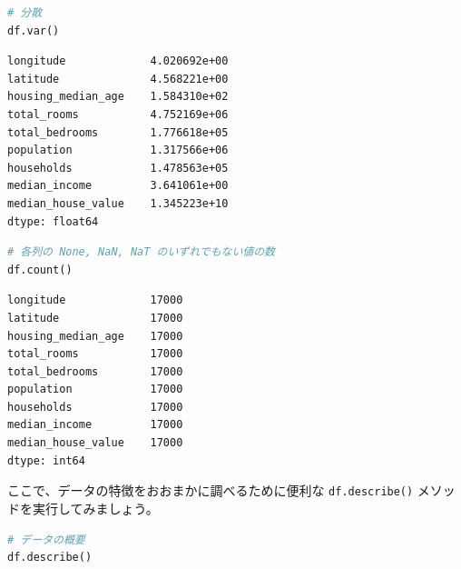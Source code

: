 \begin{lstlisting}[style=codecell,language=Python]
# 分散
df.var()
\end{lstlisting}

\begin{lstlisting}[style=outputcell]
longitude             4.020692e+00
latitude              4.568221e+00
housing_median_age    1.584310e+02
total_rooms           4.752169e+06
total_bedrooms        1.776618e+05
population            1.317566e+06
households            1.478563e+05
median_income         3.641061e+00
median_house_value    1.345223e+10
dtype: float64
\end{lstlisting}

\begin{lstlisting}[style=codecell,language=Python]
# 各列の None, NaN, NaT のいずれでもない値の数
df.count()
\end{lstlisting}

\begin{lstlisting}[style=outputcell]
longitude             17000
latitude              17000
housing_median_age    17000
total_rooms           17000
total_bedrooms        17000
population            17000
households            17000
median_income         17000
median_house_value    17000
dtype: int64
\end{lstlisting}

ここで、データの特徴をおおまかに調べるために便利な \texttt{df.describe()} メソッドを実行してみましょう。


\begin{lstlisting}[style=codecell,language=Python]
# データの概要
df.describe()
\end{lstlisting}

